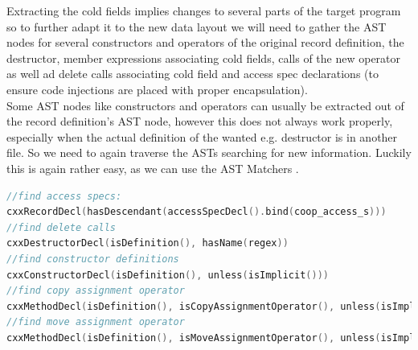 Extracting the cold fields implies changes to several parts of the target program so to further adapt it to the new data layout we will need to gather the AST nodes for several constructors and operators of the original record definition, the destructor, member expressions associating cold fields, calls of the new operator as well ad delete calls associating cold field and access spec declarations (to ensure code injections are placed with proper encapsulation).\\
Some AST nodes like constructors and operators can usually be extracted out of the record definition's AST node, however this does not always work properly, especially when the actual definition of the wanted e.g. destructor is in another file. So we need to again traverse the ASTs searching for new information. Luckily this is again rather easy, as we can use the AST Matchers .
\begin{lstlisting}[language=C++, name={Shortened excerpts for some AST Matchers to retreive information we need to implement changes - second data aggregation.}, label={second_data_aggregation}]
//find access specs:
cxxRecordDecl(hasDescendant(accessSpecDecl().bind(coop_access_s)))
//find delete calls
cxxDestructorDecl(isDefinition(), hasName(regex))
//find constructor definitions
cxxConstructorDecl(isDefinition(), unless(isImplicit()))
//find copy assignment operator
cxxMethodDecl(isDefinition(), isCopyAssignmentOperator(), unless(isImplicit()))
//find move assignment operator
cxxMethodDecl(isDefinition(), isMoveAssignmentOperator(), unless(isImplicit()))
\end{lstlisting}
